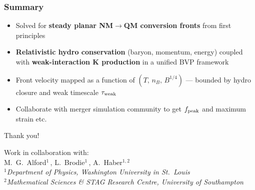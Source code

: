 \documentclass{beamer}
\newcommand{\bi}{\begin{itemize}}
\newcommand{\ei}{\end{itemize}}
\begin{document}
\begin{frame}
\frametitle{Summary}

\bi
  \item[\checkmark] Solved for \textbf{steady planar NM$\to$QM conversion fronts} from first principles
  \vspace{0.3em}
  \item[\checkmark] \textbf{Relativistic hydro conservation} (baryon, momentum, energy) coupled with \textbf{weak-interaction K production} in a unified BVP framework
  \vspace{0.3em}
  \item[\checkmark] Front velocity mapped as a function of $(T,\,n_B,\,B^{1/4})$ — bounded by hydro closure and weak timescale $\tau_{\rm weak}$
  \vspace{0.3em}
  \item[$\square$] Collaborate with merger simulation community to get $f_{\rm peak}$ and maximum strain etc. %
\ei


\end{frame}


\begin{frame}
\vspace{1.5em}
\Huge{\centerline{Thank you!}}
\vspace{1.5em}

{\normalsize
\begin{center}
{Work in collaboration with:}\\[0.5em]
M.~G.~Alford$^{1}$\,,\quad
L.~Brodie$^{1}$\,,\quad
A.~Haber$^{1,2}$\\
\vspace{0.8em}
{\small\it $^1$Department of Physics, Washington University in St.\ Louis}\\
{\small\it $^2$Mathematical Sciences \& STAG Research Centre, University of Southampton}\\
\end{center}
}

\end{frame}




\end{document}
